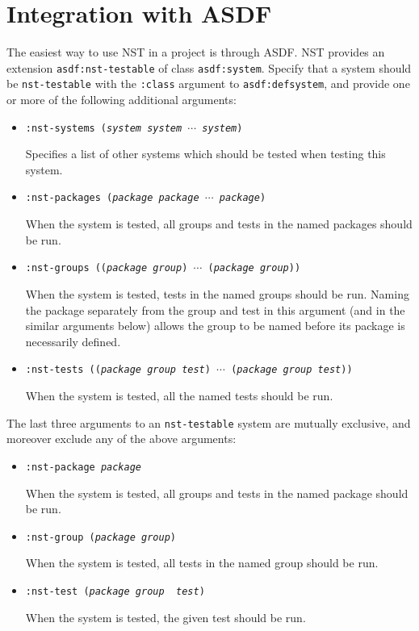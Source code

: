 \section{Integration with ASDF}

The easiest way to use NST in a project is through ASDF.  NST provides
an extension \texttt{asdf:nst-testable} of class \texttt{asdf:system}.
Specify that a system should be \texttt{nst-testable} with the
\texttt{:class} argument to \texttt{asdf:defsystem}, and provide one
or more of the following additional arguments:
\begin{itemize}
\item\texttt{:nst-systems ({\slshape system} {\slshape system}
    $\cdots$ {\slshape system})}\par Specifies a list of other systems
  which should be tested when testing this system.
\item\texttt{:nst-packages ({\slshape package} {\slshape package}
    $\cdots$ {\slshape package})}\par When the system is tested, all
  groups and tests in the named packages should be run.
\item\texttt{:nst-groups (({\slshape package} {\slshape group})
    $\cdots$ ({\slshape package} {\slshape group}))}\par When the
  system is tested, tests in the named groups should be run.  Naming
  the package separately from the group and test in this argument (and
  in the similar arguments below) allows the group to be named before
  its package is necessarily defined.
\item\texttt{:nst-tests (({\slshape package} {\slshape group}
    {\slshape test}) $\cdots$ ({\slshape package} {\slshape group}
    {\slshape test}))}\par When the system is tested, all the named
  tests should be run.
\end{itemize}
The last three arguments to an \texttt{nst-testable} system are
mutually exclusive, and moreover exclude any of the above arguments:
\begin{itemize}
\item\texttt{:nst-package {\slshape package}}\par When the system is
  tested, all groups and tests in the named package should be run.
\item\texttt{:nst-group ({\slshape package} {\slshape group})}\par
  When the system is tested, all tests in the named group should be
  run.
\item\texttt{:nst-test ({\slshape package} {\slshape group} {\slshape
      test})}\par When the system is tested, the given test should be
  run.
\end{itemize}
